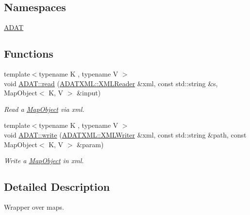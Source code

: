 \subsection*{Namespaces}
\begin{DoxyCompactItemize}
\item 
 \mbox{\hyperlink{namespaceADAT}{A\+D\+AT}}
\end{DoxyCompactItemize}
\subsection*{Functions}
\begin{DoxyCompactItemize}
\item 
{\footnotesize template$<$typename K , typename V $>$ }\\void \mbox{\hyperlink{namespaceADAT_ab1cb4aab951dd138f8f0a73f5c3ead6d}{A\+D\+A\+T\+::read}} (\mbox{\hyperlink{classADATXML_1_1XMLReader}{A\+D\+A\+T\+X\+M\+L\+::\+X\+M\+L\+Reader}} \&xml, const std\+::string \&s, Map\+Object$<$ K, V $>$ \&input)
\begin{DoxyCompactList}\small\item\em Read a \mbox{\hyperlink{classADAT_1_1MapObject}{Map\+Object}} via xml. \end{DoxyCompactList}\item 
{\footnotesize template$<$typename K , typename V $>$ }\\void \mbox{\hyperlink{namespaceADAT_a38920c20e5e4ccb234f9a05e436a4faa}{A\+D\+A\+T\+::write}} (\mbox{\hyperlink{classADATXML_1_1XMLWriter}{A\+D\+A\+T\+X\+M\+L\+::\+X\+M\+L\+Writer}} \&xml, const std\+::string \&path, const Map\+Object$<$ K, V $>$ \&param)
\begin{DoxyCompactList}\small\item\em Write a \mbox{\hyperlink{classADAT_1_1MapObject}{Map\+Object}} in xml. \end{DoxyCompactList}\end{DoxyCompactItemize}


\subsection{Detailed Description}
Wrapper over maps. 

